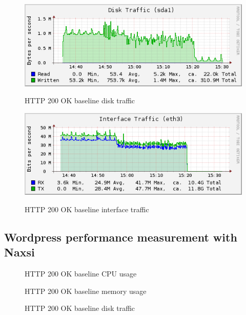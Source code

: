 \documentclass[Measurement results]{subfiles}
\begin{document}
\begin{figure}[H]
\centering
\caption{HTTP 200 OK baseline disk traffic}
\includegraphics[scale=0.7]{images/results/baseline_200/disk.png}
\label{fig:Baseline Nginx disk traffic}
\end{figure}

\begin{figure}[H]
\centering
\caption{HTTP 200 OK baseline interface traffic}
\includegraphics[scale=0.7]{images/results/baseline_200/interface.png}
\label{fig:Baseline Nginx interface traffic}
\end{figure}

\subsection{Wordpress performance measurement with Naxsi}
\begin{figure}[H]
\centering
\caption{HTTP 200 OK baseline CPU usage}
\label{fig:Baseline Nginx CPU usage}
\end{figure}

\begin{figure}[H]
\centering
\caption{HTTP 200 OK baseline memory usage}
\label{fig:Baseline Nginx memory usage}
\end{figure}

\begin{figure}[H]
\centering
\caption{HTTP 200 OK baseline disk traffic}
\label{fig:Baseline Nginx disk traffic}
\end{figure}
\end{document}
